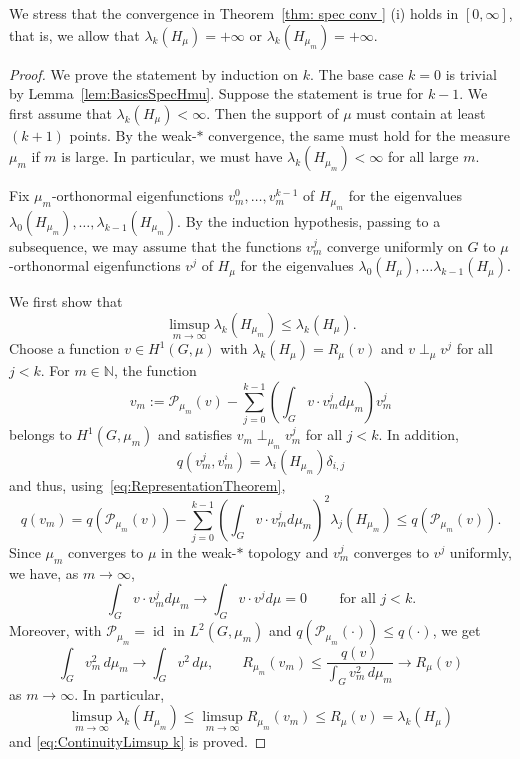 \documentclass[reqno]{amsart}
\theoremstyle{plain}
\theoremstyle{definition}
\theoremstyle{remark}
\numberwithin{equation}{section}
\newcommand{\N}{\mathbb{N}}     %
\newcommand{\cP}{\mathcal{P}}   %
\begin{document}
We stress that the convergence in Theorem~\ref{thm: spec conv } (i) holds in $[0, \infty]$, that is, we allow that $\lambda_k(H_\mu) =+ \infty$ or $\lambda_k(H_{\mu_m}) = + \infty$.


\begin{proof}
	We prove the statement by induction on $k$. The base case $k=0$ is trivial by Lemma~\ref{lem:BasicsSpecHmu}. Suppose the statement is true for $k-1$. We first assume that $\lambda_k(H_\mu) < \infty$. Then the support of $\mu$ must contain at least $(k+1)$ points. By the weak-$\ast$ convergence, the same must hold for the measure $\mu_m$ if $m$ is large. In particular, we must have $\lambda_k(H_{\mu_m})  < \infty$ for all large $m$.
	
	Fix $\mu_m$-orthonormal eigenfunctions $v^{0}_m,\dots,v^{k-1}_m$ of $H_{\mu_m}$ for the eigenvalues $\lambda_0(H_{\mu_m}), \dots, \lambda_{k-1}(H_{\mu_m})$. By the induction hypothesis, passing to a subsequence, we may assume that the functions $v^j_m$ converge uniformly on $G$ to $\mu$-orthonormal eigenfunctions $v^j$ of $H_\mu$ for the eigenvalues $\lambda_0(H_\mu), \dots \lambda_{k-1}(H_\mu)$.
	
	
	We first show that
	\begin{equation} \label{eq:ContinuityLimsup k}
		\limsup_{m \to \infty} \lambda_k(H_{\mu_m}) \le \lambda_k(H_\mu).
	\end{equation}
	Choose a function $v \in H^1(G, \mu)$ with $\lambda_k(H_\mu) = R_\mu(v)$ and $v\perp_{\mu} v^j$ for all $j<k$. For $m\in \N$, the function
	\[
	v_m := \cP_{\mu_m} (v) - \sum_{j=0}^{k-1} \left( \int_{G} v\cdot v_{m}^j d\mu_m\right) v_{m}^j
	\]
	belongs to $H^1(G, \mu_m)$ and satisfies $v_m \perp_{\mu_m} v_{m}^j $ for all $j< k$. In addition,
	\[
	q(v_{m}^j, v_{m}^i)  = \lambda_i(H_{\mu_m}) \delta_{i,j}
	\]
	and thus, using~\eqref{eq:RepresentationTheorem},
	\[
	q(v_m) = q(\cP_{\mu_{m}}(v)) - \sum_{j=0}^{k-1} \left(\int_{G}v \cdot v_{m}^j d\mu_{m}\right)^2\lambda_j(H_{\mu_{m}}) \le q(\cP_{\mu_{m}}(v)).
	\]
	Since $\mu_m$ converges to $\mu$ in the weak-$\ast$ topology and $v_{m}^j$ converges to $v^j$ uniformly, we have, as $m \to \infty$,
	\[
	\int_{G}v \cdot v_{m}^j d \mu_m \to \int_{G} v\cdot v^j d\mu = 0 \qquad \text{ for all } j < k.
	\]
	Moreover, with $\cP_{\mu_m}=\operatorname{id}$ in $L^2(G, \mu_m)$ and $q(\cP_{\mu_m} (\cdot)) \leq q(\cdot)$, we get
	\[
	\int_G v_m^2 \, d \mu_m \to  \int_G v^2 \, d\mu, \qquad   R_{\mu_m}(v_m) \leq \frac{q(v)}{\int_G v_m^2 \, d \mu_m} \to R_\mu(v)
	\]
	as $m \to \infty$. In particular,
	\[
	\limsup_{m \to \infty} \lambda_k(H_{\mu_m}) \le \limsup_{m \to \infty} R_{\mu_m}(v_m) \leq R_\mu(v) = \lambda_k(H_\mu)
	\]
	and \eqref{eq:ContinuityLimsup k} is proved.
	

\end{proof}
\end{document}
